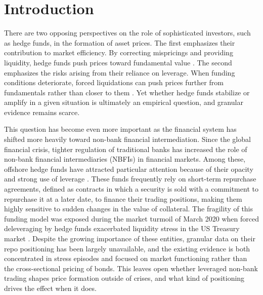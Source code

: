 \documentclass[english, 11pt, oneside]{article}
\begin{document}
\newpage 
\section{Introduction}
There are two opposing perspectives on the role of sophisticated investors, such as hedge funds, in the formation of asset prices. The first emphasizes their contribution to market efficiency. By correcting mispricings and providing liquidity, hedge funds push prices toward fundamental value \citep{gromb2002, cao2018}. The second emphasizes the risks arising from their reliance on leverage. When funding conditions deteriorate, forced liquidations can push prices further from fundamentals rather than closer to them \citep{shleifer1997, brunnermeier2009, geanakoplos2010}. Yet whether hedge funds stabilize or amplify in a given situation is ultimately an empirical question, and granular evidence remains scarce.

This question has become even more important as the financial system has shifted more heavily toward non-bank financial intermediation. Since the global financial crisis, tighter regulation of traditional banks has increased the role of non-bank financial intermediaries (NBFIs) in financial markets. Among these, offshore hedge funds have attracted particular attention because of their opacity and strong use of leverage \citep{barth2025cross}. These funds frequently rely on short-term repurchase agreements, defined as contracts in which a security is sold with a commitment to repurchase it at a later date, to finance their trading positions, making them highly sensitive to sudden changes in the value of collateral. The fragility of this funding model was exposed during the market turmoil of March 2020 when forced deleveraging by hedge funds exacerbated liquidity stress in the US Treasury market \citep{barth2025, kruttli2025, aramonte2023}. Despite the growing importance of these entities, granular data on their repo positioning has been largely unavailable, and the existing evidence is both concentrated in stress episodes and focused on market functioning rather than the cross-sectional pricing of bonds. This leaves open whether leveraged non-bank trading shapes price formation outside of crises, and what kind of positioning drives the effect when it does.
\end{document}
